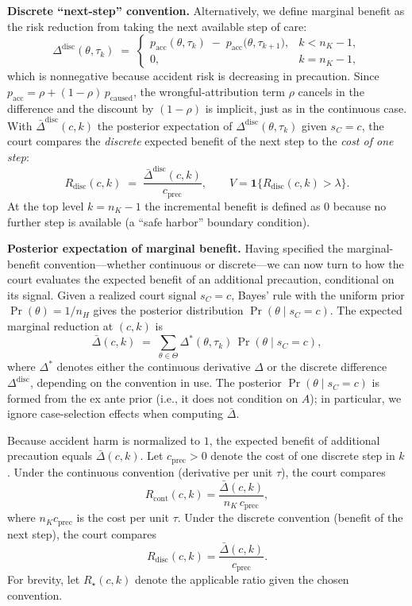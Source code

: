 \documentclass{article}
\begin{document}
\medskip
\noindent\textbf{Discrete “next-step” convention.}
Alternatively, we define marginal benefit as the risk reduction from taking the next available step of care:
\[
\Delta^{\mathrm{disc}}(\theta,\tau_k)\;=\;
\begin{cases}
p_{\mathrm{acc}}(\theta,\tau_k)\;-\;p_{\mathrm{acc}}\!\bigl(\theta,\tau_{k+1}\bigr), & k<n_K-1,\\[4pt]
0, & k=n_K-1,
\end{cases}
\]
which is nonnegative because accident risk is decreasing in precaution. Since \(p_{\mathrm{acc}}=\rho+(1-\rho)\,p_{\mathrm{caused}}\), the wrongful-attribution term \(\rho\) cancels in the difference and the discount by \((1-\rho)\) is implicit, just as in the continuous case. With \(\bar{\Delta}^{\mathrm{disc}}(c,k)\) the posterior expectation of \(\Delta^{\mathrm{disc}}(\theta,\tau_k)\) given \(s_C=c\), the court compares the \emph{discrete} expected benefit of the next step to the \emph{cost of one step}:
\[
R_{\mathrm{disc}}(c,k)\;=\;\frac{\bar{\Delta}^{\mathrm{disc}}(c,k)}{\,c_{\mathrm{prec}}\,},
\qquad
V=\mathbf{1}\!\{R_{\mathrm{disc}}(c,k)>\lambda\}.
\]
At the top level \(k=n_K-1\) the incremental benefit is defined as \(0\) because no further step is available (a “safe harbor” boundary condition).

\medskip
\noindent\textbf{Posterior expectation of marginal benefit.}
Having specified the marginal-benefit convention—whether continuous or discrete—we can now turn to how the court evaluates the expected benefit of an additional precaution, conditional on its signal. Given a realized court signal $s_C=c$, Bayes’ rule with the uniform prior $\Pr(\theta)=1/n_H$ gives the posterior distribution $\Pr(\theta \mid s_C=c)$. The expected marginal reduction at $(c,k)$ is
\[
\bar{\Delta}(c,k)\;=\;\sum_{\theta\in\Theta}\Delta^{*}(\theta,\tau_k)\,\Pr(\theta\mid s_C=c),
\]
where $\Delta^{*}$ denotes either the continuous derivative $\Delta$ or the discrete difference $\Delta^{\mathrm{disc}}$, depending on the convention in use. The posterior $\Pr(\theta\mid s_C=c)$ is formed from the ex ante prior (i.e., it does not condition on $A$); in particular, we ignore case-selection effects when computing $\bar{\Delta}$.

Because accident harm is normalized to $1$, the expected benefit of additional precaution equals $\bar{\Delta}(c,k)$. Let $c_{\mathrm{prec}}>0$ denote the cost of one discrete step in $k$. Under the continuous convention (derivative per unit $\tau$), the court compares
\[
R_{\mathrm{cont}}(c,k)=\frac{\bar{\Delta}(c,k)}{\,n_K\,c_{\mathrm{prec}}\,},
\]
where $n_K c_{\mathrm{prec}}$ is the cost per unit $\tau$. Under the discrete convention (benefit of the next step), the court compares
\[
R_{\mathrm{disc}}(c,k)=\frac{\bar{\Delta}(c,k)}{\,c_{\mathrm{prec}}\,}.
\]
For brevity, let $R_\star(c,k)$ denote the applicable ratio given the chosen convention.
\end{document}
